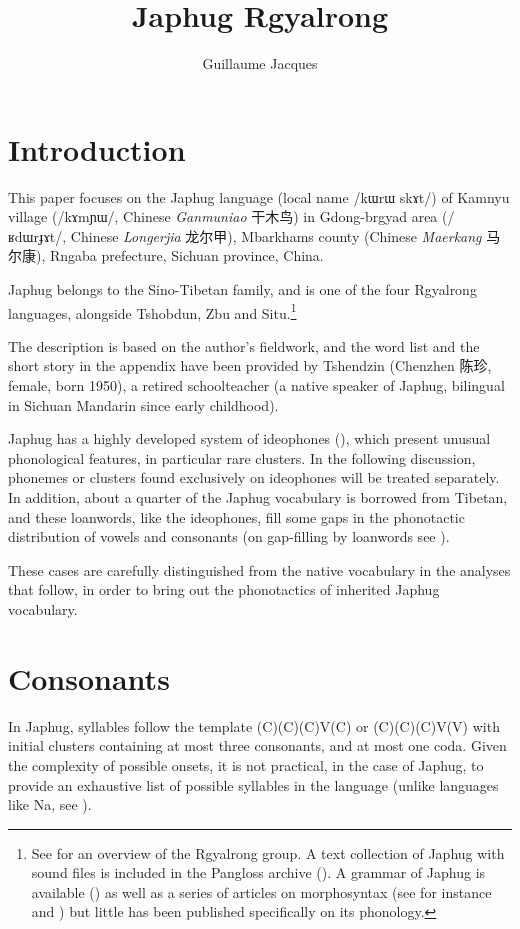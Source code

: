 \documentclass[oldfontcommands,oneside,a4paper,11pt]{article}
\newcommand{\ipa}[1]{/#1/} %
\newcommand{\zh}[1]{{\cn #1}}
\begin{document}
 

\title{Japhug Rgyalrong}
\author{Guillaume Jacques}
\maketitle
\linenumbers
 \section{Introduction}
 This paper focuses on the Japhug language (local name \ipa{kɯrɯ skɤt}) of Kamnyu village (\ipa{kɤmɲɯ}, Chinese \textit{Ganmuniao} \zh{干木鸟}) in Gdong-brgyad area (\ipa{ʁdɯrɟɤt}, Chinese  \textit{Longerjia} \zh{龙尔甲}), Mbarkhams county (Chinese \textit{Maerkang} \zh{马尔康}), Rngaba prefecture, Sichuan province, China.
 
 Japhug belongs to the Sino-Tibetan family, and is one of the four Rgyalrong languages, alongside Tshobdun, Zbu and Situ.\footnote{See  \citet{jackson00sidaba} for an overview of the Rgyalrong group. A text collection of Japhug with sound files is included in the Pangloss archive (\citealt{michailovsky14pangloss}). A grammar of Japhug is available (\citealt{jacques08}) as well as a series of articles on morphosyntax (see for instance  \citealt{jacques13harmonization} and
 \citealt{jacques14antipassive}) but little has been published specifically on its phonology. } 
 
The description is based on the author’s fieldwork, and the word list and the short story in the appendix have been provided by Tshendzin (Chenzhen \zh{陈珍}, female, born 1950), a retired schoolteacher (a native speaker of Japhug, bilingual in Sichuan Mandarin since early childhood).

 Japhug has a highly  developed system of ideophones (\citealt{japhug14ideophones}), which present unusual phonological features, in particular rare clusters. In the following discussion, phonemes or clusters found exclusively on  ideophones will be treated separately. In addition, about a quarter of the Japhug vocabulary is borrowed from Tibetan, and these loanwords, like the ideophones, fill some gaps in the phonotactic distribution of vowels and consonants (on gap-filling by loanwords see \citealt[63-64]{martinet05economie}).
 
 These cases are carefully distinguished from the native vocabulary in the analyses that follow, in order to bring out the phonotactics of inherited Japhug vocabulary.

 
 \section{Consonants}
 In Japhug, syllables follow the template (C)(C)(C)V(C) or (C)(C)(C)V(V) with initial clusters containing at most three consonants, and at most one coda. Given the complexity of possible onsets, it is not practical, in the case of Japhug, to provide an exhaustive list of possible syllables in the language (unlike languages like Na, see \citealt{boydalexis06}).
 
\end{document}
